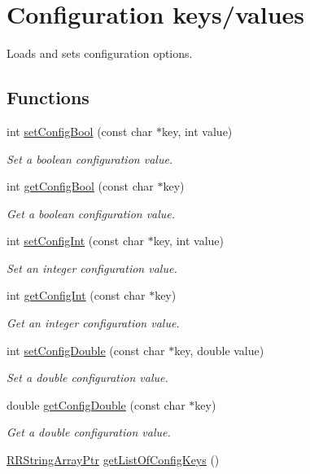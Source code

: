 \hypertarget{group__config}{\section{Configuration keys/values}
\label{group__config}
}


Loads and sets configuration options.  


\subsection*{Functions}
\begin{DoxyCompactItemize}
\item 
int \hyperlink{group__config_gae778c76310afed5f769e44bd181e5f4a}{set\+Config\+Bool} (const char $\ast$key, int value)
\begin{DoxyCompactList}\small\item\em Set a boolean configuration value. \end{DoxyCompactList}\item 
int \hyperlink{group__config_ga22a14b4d4a38b8f70b181600eea85afb}{get\+Config\+Bool} (const char $\ast$key)
\begin{DoxyCompactList}\small\item\em Get a boolean configuration value. \end{DoxyCompactList}\item 
int \hyperlink{group__config_gaa99f01232a745b6b424ac0b7b683bfe3}{set\+Config\+Int} (const char $\ast$key, int value)
\begin{DoxyCompactList}\small\item\em Set an integer configuration value. \end{DoxyCompactList}\item 
int \hyperlink{group__config_ga743f765ab2f01f2200f4e1d6f228fc24}{get\+Config\+Int} (const char $\ast$key)
\begin{DoxyCompactList}\small\item\em Get an integer configuration value. \end{DoxyCompactList}\item 
int \hyperlink{group__config_gafb1fcaaa3158be1cded7a28f3a2e6b74}{set\+Config\+Double} (const char $\ast$key, double value)
\begin{DoxyCompactList}\small\item\em Set a double configuration value. \end{DoxyCompactList}\item 
double \hyperlink{group__config_ga144a5a318ee0d879fa60fc7138b4f349}{get\+Config\+Double} (const char $\ast$key)
\begin{DoxyCompactList}\small\item\em Get a double configuration value. \end{DoxyCompactList}\item 
\hypertarget{group__config_ga1a1ed70f4b55da8fd36909dad2ad9477}{\hyperlink{rrc__types_8h_a7c9475df6c7337d99482b13a365e7596}{R\+R\+String\+Array\+Ptr} \hyperlink{group__config_ga1a1ed70f4b55da8fd36909dad2ad9477}{get\+List\+Of\+Config\+Keys} ()}\label{group__config_ga1a1ed70f4b55da8fd36909dad2ad9477}


\end{DoxyCompactItemize}
